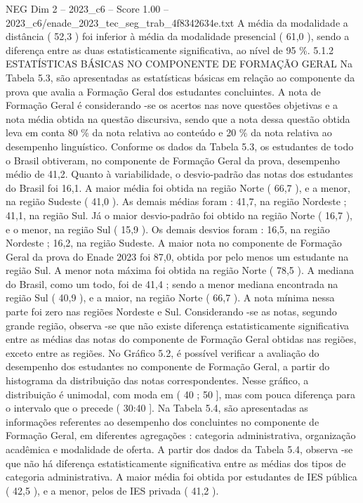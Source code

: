 \begin{textsample}{NEG Dim 2 – 2023\_c6 – Score 1.00 – 2023\_c6/enade\_2023\_tec\_seg\_trab\_4f8342634e.txt}
A média da modalidade a distância ( 52,3 ) foi inferior à média da modalidade presencial ( 61,0 ), sendo a diferença entre as duas estatisticamente significativa, ao nível de 95 \%. 5.1.2 ESTATÍSTICAS BÁSICAS NO COMPONENTE DE FORMAÇÃO GERAL Na Tabela 5.3, são apresentadas as estatísticas básicas em relação ao componente da prova que avalia a Formação Geral dos estudantes concluintes.
A nota de Formação Geral é considerando -se os acertos nas nove questões objetivas e a nota média obtida na questão discursiva, sendo que a nota dessa questão obtida leva em conta 80 \% da nota relativa ao conteúdo e 20 \% da nota relativa ao desempenho linguístico.
Conforme os dados da Tabela 5.3, os estudantes de todo o Brasil obtiveram, no componente de Formação Geral da prova, desempenho médio de 41,2.
Quanto à variabilidade, o desvio-padrão das notas dos estudantes do Brasil foi 16,1.
A maior média foi obtida na região Norte ( 66,7 ), e a menor, na região Sudeste ( 41,0 ).
As demais médias foram : 41,7, na região Nordeste ; 41,1, na região Sul.
Já o maior desvio-padrão foi obtido na região Norte ( 16,7 ), e o menor, na região Sul ( 15,9 ).
Os demais desvios foram : 16,5, na região Nordeste ; 16,2, na região Sudeste.
A maior nota no componente de Formação Geral da prova do Enade 2023 foi 87,0, obtida por pelo menos um estudante na região Sul.
A menor nota máxima foi obtida na região Norte ( 78,5 ).
A mediana do Brasil, como um todo, foi de 41,4 ; sendo a menor mediana encontrada na região Sul ( 40,9 ), e a maior, na região Norte ( 66,7 ).
A nota mínima nessa parte foi zero nas regiões Nordeste e Sul.
Considerando -se as notas, segundo grande região, observa -se que não existe diferença estatisticamente significativa entre as médias das notas do componente de Formação Geral obtidas nas regiões, exceto entre as regiões.
No Gráfico 5.2, é possível verificar a avaliação do desempenho dos estudantes no componente de Formação Geral, a partir do histograma da distribuição das notas correspondentes.
Nesse gráfico, a distribuição é unimodal, com moda em ( 40 ; 50 ], mas com pouca diferença para o intervalo que o precede ( 30:40 ].
Na Tabela 5.4, são apresentadas as informações referentes ao desempenho dos concluintes no componente de Formação Geral, em diferentes agregações : categoria administrativa, organização acadêmica e modalidade de oferta.
A partir dos dados da Tabela 5.4, observa -se que não há diferença estatisticamente significativa entre as médias dos tipos de categoria administrativa.
A maior média foi obtida por estudantes de IES pública ( 42,5 ), e a menor, pelos de IES privada ( 41,2 ).

\end{textsample}
